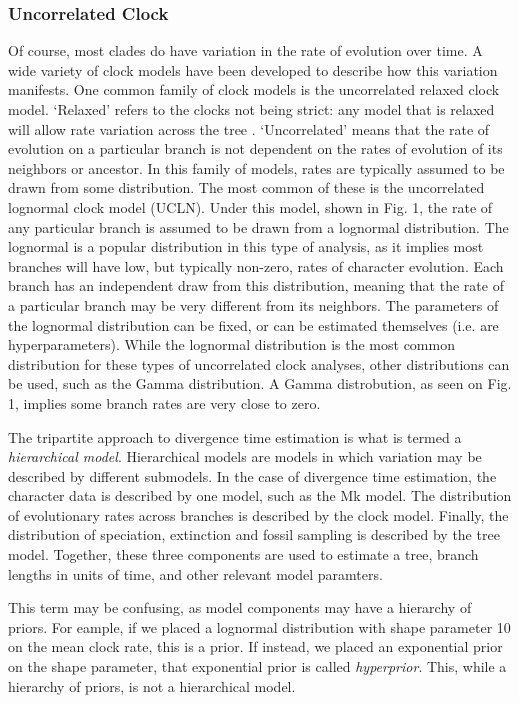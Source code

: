 \documentclass[11pt]{article}
\makeatletter
\newenvironment{boxedtext}[1]{%
  \begin{mdframed}[frametitle=#1,
    frametitlefont=\scshape\mdseries\sffamily,
    frametitlealignment=\centering,
    backgroundcolor=black!20,
    hidealllines=true,
    innerleftmargin=11\p@,innerrightmargin=11\p@,
    frametitleaboveskip=0.5\baselineskip,
    innerbottommargin=0.5\baselineskip,
    skipabove=\baselineskip,skipbelow=0.5\baselineskip]
}{%
  \end{mdframed}%
}
\makeatother
\begin{document}
\subsubsection{Uncorrelated Clock}
Of course, most clades do have variation in the rate of evolution over time. 
A wide variety of clock models have been developed to describe how this variation manifests.
One common family of clock models is the uncorrelated relaxed clock model.
`Relaxed' refers to the clocks not being strict: any model that is relaxed will allow rate variation across the tree \cite{Drummond2006, Drummond2007}.
`Uncorrelated' means that the rate of evolution on a particular branch is not dependent on the rates of evolution of its neighbors or ancestor.
In this family of models, rates are typically assumed to be drawn from some distribution.
The most common of these is the uncorrelated lognormal clock model (UCLN).
Under this model, shown in Fig. 1, the rate of any particular branch is assumed to be drawn from a lognormal distribution.
The lognormal is a popular distribution in this type of analysis, as it implies most branches will have low, but typically non-zero, rates of character evolution. 
Each branch has an independent draw from this distribution, meaning that the rate of a particular branch may be very different from its neighbors.
The parameters of the lognormal distribution can be fixed, or can be estimated themselves (i.e. are hyperparameters).
While the lognormal distribution is the most common distribution for these types of uncorrelated clock analyses, other distributions can be used, such as the Gamma distribution.
A Gamma distrobution, as seen on Fig. 1, implies some branch rates are very close to zero.

\begin{boxedtext}{Hierarchical Models}

The tripartite approach to divergence time estimation is what is termed a \textit{hierarchical model}. 
Hierarchical models are models in which variation may be described by different submodels.
In the case of divergence time estimation, the character data is described by one model, such as the Mk model.
The distribution of evolutionary rates across branches is described by the clock model.
Finally, the distribution of speciation, extinction and fossil sampling is described by the tree model.
Together, these three components are used to estimate a tree, branch lengths in units of time, and other relevant model paramters.

This term may be confusing, as model components may have a hierarchy of priors. 
For eample, if we placed a lognormal distribution with shape parameter 10 on the mean clock rate, this is a prior.
If instead, we placed an exponential prior on the shape parameter, that exponential prior is called \textit{hyperprior}.
This, while a hierarchy of priors, is not a hierarchical model. 

\end{boxedtext}
\clearpage
\end{document}
